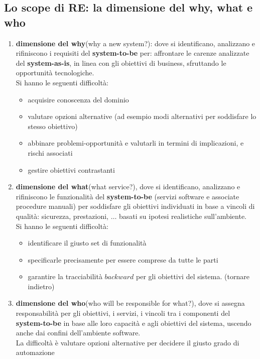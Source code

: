 \subsection{Lo scope di RE: la dimensione del why, what e who}
\begin{enumerate}
    \item \textbf{dimensione del why}(why a new system?): dove si identificano, analizzano e rifiniscono i requisiti del \textbf{system-to-be} per: affrontare le carenze analizzate del \textbf{system-as-is}, in linea con gli obiettivi di business, sfruttando le opportunità tecnologiche.\\ 
    Si hanno le seguenti difficoltà:
      \begin{itemize}
        \item acquisire conoscenza del dominio 
        \item valutare opzioni alternative (ad esempio modi alternativi per soddisfare lo stesso obiettivo) 
        \item abbinare problemi-opportunità e valutarli in termini di implicazioni, e rischi associati 
        \item gestire obiettivi contrastanti
      \end{itemize}
    \item \textbf{dimensione del what}(what service?), dove si identificano, analizzano e rifiniscono le funzionalità del \textbf{system-to-be} (servizi software e associate procedure manuali) per soddisfare gli obiettivi individuati in base a vincoli di qualità: sicurezza, prestazioni, $\dots$ basati su ipotesi realistiche sull'ambiente.\\
    Si hanno le seguenti difficoltà:
        \begin{itemize}
            \item identificare il giusto set di funzionalità 
            \item specificarle precisamente per essere comprese da tutte le parti 
            \item garantire la tracciabilità $backward$ per gli obiettivi del sistema. (tornare indietro)
        \end{itemize}
    \item \textbf{dimensione del who}(who will be responsible for what?), dove si assegna responsabilità per gli obiettivi, i servizi, i vincoli tra i componenti del \textbf{system-to-be} in base alle loro capacità e agli obiettivi del sistema, uscendo anche dai confini dell'ambiente software.\\
    La difficoltà è valutare opzioni alternative per decidere il giusto grado di automazione 
\end{enumerate}

